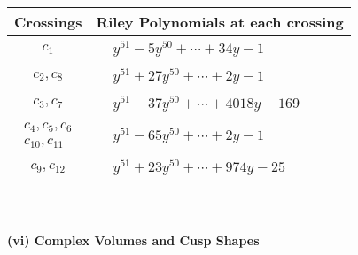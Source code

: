 \documentclass[1p]{elsarticle_modified}
\theoremstyle{definition}
\begin{document}
\begin{tabular}{m{50pt}|m{274pt}}
Crossings & \hspace{64pt}Riley Polynomials at each crossing \\
\hline $$\begin{aligned}c_{1}\end{aligned}$$&$\begin{aligned}
&y^{51}-5 y^{50}+\cdots+34 y-1
\end{aligned}$\\
\hline $$\begin{aligned}c_{2},c_{8}\end{aligned}$$&$\begin{aligned}
&y^{51}+27 y^{50}+\cdots+2 y-1
\end{aligned}$\\
\hline $$\begin{aligned}c_{3},c_{7}\end{aligned}$$&$\begin{aligned}
&y^{51}-37 y^{50}+\cdots+4018 y-169
\end{aligned}$\\
\hline $$\begin{aligned}c_{4},c_{5},c_{6}\\c_{10},c_{11}\end{aligned}$$&$\begin{aligned}
&y^{51}-65 y^{50}+\cdots+2 y-1
\end{aligned}$\\
\hline $$\begin{aligned}c_{9},c_{12}\end{aligned}$$&$\begin{aligned}
&y^{51}+23 y^{50}+\cdots+974 y-25
\end{aligned}$\\
\hline
\end{tabular}\\~\\
\newpage\flushleft \textbf{(vi) Complex Volumes and Cusp Shapes}
\end{document}
